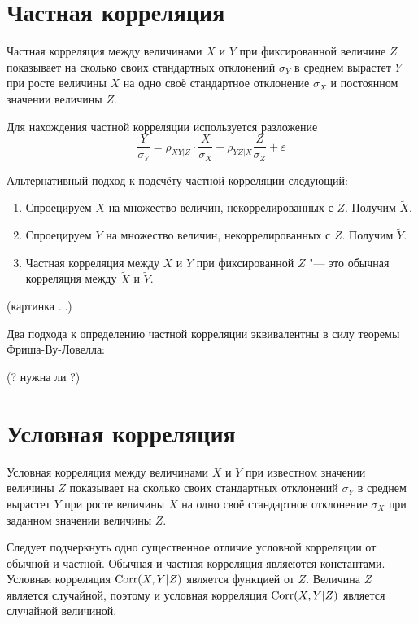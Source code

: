 \documentclass[10pt]{article}
\begin{document}
\section{Частная корреляция}

\begin{definition}
Частная корреляция между величинами $X$ и $Y$ при фиксированной величине $Z$ показывает на сколько своих стандартных отклонений $\sigma_Y$ в среднем вырастет $Y$ при росте величины $X$ на одно своё стандартное отклонение $\sigma_X$ и постоянном значении величины $Z$.
\end{definition}

Для нахождения частной корреляции используется разложение
\[
\frac{Y}{\sigma_Y}=\rho_{XY|Z} \cdot \frac{X}{\sigma_X} + \rho_{YZ|X} \frac{Z}{\sigma_Z} + \varepsilon
\]


Альтернативный подход к подсчёту частной корреляции следующий:
\begin{enumerate}
\item Спроецируем $X$ на множество величин, некоррелированных с $Z$. Получим $\tilde{X}$.
\item Спроецируем $Y$ на множество величин, некоррелированных с $Z$. Получим $\tilde{Y}$.
\item Частная корреляция между $X$ и $Y$ при фиксированной $Z$ "--- это обычная корреляция между $\tilde{X}$ и $\tilde{Y}$.
\end{enumerate}


(картинка ...)


Два подхода к определению частной корреляции эквивалентны в силу теоремы Фриша-Ву-Ловелла:

(?   нужна ли ?)



\section{Условная корреляция}

\begin{definition}
Условная корреляция между величинами $X$ и $Y$ при известном значении величины $Z$ показывает на сколько своих стандартных отклонений $\sigma_Y$ в среднем вырастет $Y$ при росте величины $X$ на одно своё стандартное отклонение $\sigma_X$ при заданном значении величины $Z$.
\end{definition}


Следует подчеркнуть одно существенное отличие условной корреляции от обычной и частной. Обычная и частная корреляция являеются константами. Условная корреляция $\operatorname{Corr}(X,Y|Z)$ является функцией от $Z$. Величина $Z$ является случайной, поэтому и условная корреляция $\operatorname{Corr}(X,Y|Z)$ является случайной величиной. 
\end{document}
